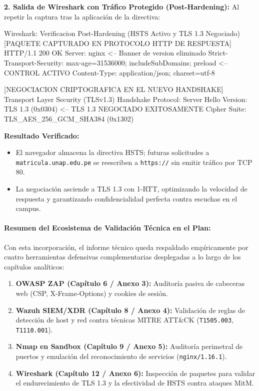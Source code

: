 \textbf{2. Salida de Wireshark con Tráfico Protegido (Post-Hardening):} Al repetir la captura tras la aplicación de la directiva:

\begin{cmdbox}{Wireshark: Verificacion Post-Hardening (HSTS Activo y TLS 1.3 Negociado)}
[PAQUETE CAPTURADO EN PROTOCOLO HTTP DE RESPUESTA]
HTTP/1.1 200 OK
Server: nginx                                           <-- Banner de version eliminado
Strict-Transport-Security: max-age=31536000; includeSubDomains; preload  <-- CONTROL ACTIVO
Content-Type: application/json; charset=utf-8

[NEGOCIACION CRIPTOGRAFICA EN EL NUEVO HANDSHAKE]
Transport Layer Security (TLSv1.3)
    Handshake Protocol: Server Hello
        Version: TLS 1.3 (0x0304)                       <-- TLS 1.3 NEGOCIADO EXITOSAMENTE
        Cipher Suite: TLS_AES_256_GCM_SHA384 (0x1302)
\end{cmdbox}

\textbf{Resultado Verificado:}
\begin{itemize}
    \item El navegador almacena la directiva HSTS; futuras solicitudes a \texttt{matricula.unap.edu.pe} se reescriben a \texttt{https://} sin emitir tráfico por TCP 80.
    \item La negociación asciende a TLS 1.3 con 1-RTT, optimizando la velocidad de respuesta y garantizando confidencialidad perfecta contra escuchas en el campus.
\end{itemize}

\newpage
\paragraph{Resumen del Ecosistema de Validación Técnica en el Plan:}
Con esta incorporación, el informe técnico queda respaldado empíricamente por cuatro herramientas defensivas complementarias desplegadas a lo largo de los capítulos analíticos:
\begin{enumerate}
    \item \textbf{OWASP ZAP (Capítulo 6 / Anexo 3):} Auditoría pasiva de cabeceras web (CSP, X-Frame-Options) y cookies de sesión.
    \item \textbf{Wazuh SIEM/XDR (Capítulo 8 / Anexo 4):} Validación de reglas de detección de host y red contra técnicas MITRE ATT\&CK (\texttt{T1505.003}, \texttt{T1110.001}).
    \item \textbf{Nmap en Sandbox (Capítulo 9 / Anexo 5):} Auditoría perimetral de puertos y emulación del reconocimiento de servicios (\texttt{nginx/1.16.1}).
    \item \textbf{Wireshark (Capítulo 12 / Anexo 6):} Inspección de paquetes para validar el endurecimiento de TLS 1.3 y la efectividad de HSTS contra ataques MitM.
\end{enumerate}

